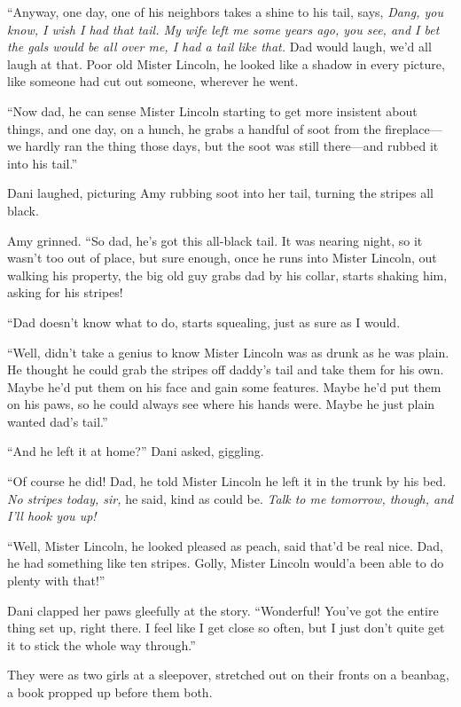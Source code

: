``Anyway, one day, one of his neighbors takes a shine to his tail, says, \emph{Dang, you know, I wish I had that tail. My wife left me some years ago, you see, and I bet the gals would be all over me, I had a tail like that.} Dad would laugh, we'd all laugh at that. Poor old Mister Lincoln, he looked like a shadow in every picture, like someone had cut out someone, wherever he went.

``Now dad, he can sense Mister Lincoln starting to get more insistent about things, and one day, on a hunch, he grabs a handful of soot from the fireplace---we hardly ran the thing those days, but the soot was still there---and rubbed it into his tail.''

Dani laughed, picturing Amy rubbing soot into her tail, turning the stripes all black.

Amy grinned. ``So dad, he's got this all-black tail. It was nearing night, so it wasn't too out of place, but sure enough, once he runs into Mister Lincoln, out walking his property, the big old guy grabs dad by his collar, starts shaking him, asking for his stripes!

``Dad doesn't know what to do, starts squealing, just as sure as I would.

``Well, didn't take a genius to know Mister Lincoln was as drunk as he was plain. He thought he could grab the stripes off daddy's tail and take them for his own. Maybe he'd put them on his face and gain some features. Maybe he'd put them on his paws, so he could always see where his hands were. Maybe he just plain wanted dad's tail.''

``And he left it at home?'' Dani asked, giggling.

``Of course he did! Dad, he told Mister Lincoln he left it in the trunk by his bed. \emph{No stripes today, sir,} he said, kind as could be. \emph{Talk to me tomorrow, though, and I'll hook you up!}

``Well, Mister Lincoln, he looked pleased as peach, said that'd be real nice. Dad, he had something like ten stripes. Golly, Mister Lincoln would'a been able to do plenty with that!''

Dani clapped her paws gleefully at the story. ``Wonderful! You've got the entire thing set up, right there. I feel like I get close so often, but I just don't quite get it to stick the whole way through.''

They were as two girls at a sleepover, stretched out on their fronts on a beanbag, a book propped up before them both.

